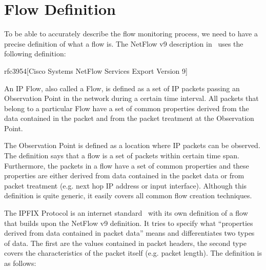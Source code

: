 \section{Flow Definition}

To be able to accurately describe the flow monitoring process, we need to have a precise definition of what a flow is. The NetFlow v9 description in~\cite{rfc3954} uses the following definition:

\begin{displaycquote}{rfc3954}[Cisco Systems NetFlow Services Export Version 9]

    An IP Flow, also called a Flow, is defined as a set of IP packets
    passing an Observation Point in the network during a certain time
    interval. All packets that belong to a particular Flow have a set of
    common properties derived from the data contained in the packet and
    from the packet treatment at the Observation Point.

\end{displaycquote}

The Observation Point is defined as a location where IP packets can be observed. The definition says that a flow is a set of packets within certain time span. Furthermore, the packets in a flow have a set of common properties and these properties are either derived from data contained in the packet data or from packet treatment (e.g. next hop IP address or input interface). Although this definition is quite generic, it easily covers all common flow creation techniques.

The IPFIX Protocol is an internet standard~\cite{rfc7011} with its own definition of a flow that builds upon the NetFlow v9 definition. It tries to specify what “properties derived from data contained in packet data” means and differentiates two types of data. The first are the values contained in packet headers, the second type covers the characteristics of the packet itself (e.g. packet length). The definition is as follows:

